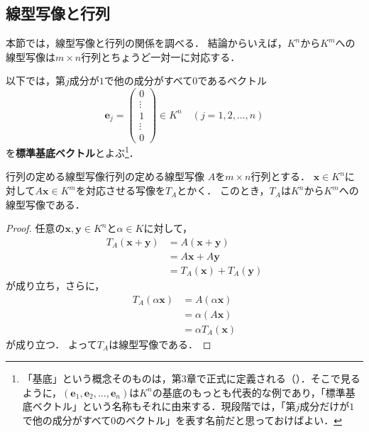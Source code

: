 \subsection{線型写像と行列}

本節では，線型写像と行列の関係を調べる．
結論からいえば，$K^n$から$K^m$への線型写像は$m \times n$行列とちょうど一対一に対応する．

以下では，第$j$成分が$1$で他の成分がすべて$0$であるベクトル
\[
  \bm{e}_j =
  \begin{pmatrix}
    0 \\ \vdots \\ 1 \\ \vdots \\ 0
  \end{pmatrix}
  \in K^n
  \quad (j = 1, 2, \dots, n)
\]
を\textbf{標準基底ベクトル}とよぶ\footnote{「基底」という概念そのものは，第3章で正式に定義される（）．そこで見るように，$(\bm{e}_1, \bm{e}_2, \dots, \bm{e}_n)$は$K^n$の基底のもっとも代表的な例であり，「標準基底ベクトル」という名称もそれに由来する．現段階では，「第$j$成分だけが$1$で他の成分がすべて$0$のベクトル」を表す名前だと思っておけばよい．}．

\begin{prop}{行列の定める線型写像}{行列の定める線型写像}
  $A$を$m \times n$行列とする．
  $\bm{x} \in K^n$に対して$A\bm{x} \in K^m$を対応させる写像を$T_A$とかく．
  このとき，$T_A$は$K^n$から$K^m$への線型写像である．
\end{prop}

\begin{leftbar}
\begin{proof}
  任意の$\bm{x}, \bm{y} \in K^n$と$\alpha \in K$に対して，
  \begin{align}
    T_A(\bm{x} + \bm{y}) &= A(\bm{x} + \bm{y}) \tag{$T_A$の定義} \\
    &= A\bm{x} + A\bm{y} \tag{行列の積の分配律} \\
    &= T_A(\bm{x}) + T_A(\bm{y}) \nonumber
  \end{align}
  が成り立ち，さらに，
  \begin{align}
    T_A(\alpha\bm{x}) &= A(\alpha\bm{x}) \tag{$T_A$の定義} \\
    &= \alpha(A\bm{x}) \tag{行列の積の性質} \\
    &= \alpha T_A(\bm{x}) \nonumber
  \end{align}
  が成り立つ．
  よって$T_A$は線型写像である．
\end{proof}
\end{leftbar}

